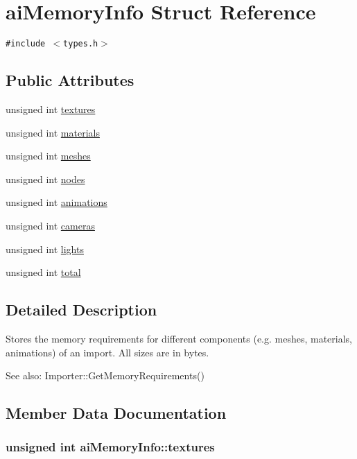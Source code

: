 \hypertarget{structai_memory_info}{
\section{aiMemoryInfo Struct Reference}
\label{structai_memory_info}
}
{\tt \#include $<$types.h$>$}

\subsection*{Public Attributes}
\begin{CompactItemize}
\item 
unsigned int \hyperlink{structai_memory_info_32817d13f0e280777e49769f8c46f168}{textures}
\item 
unsigned int \hyperlink{structai_memory_info_08b2ccd0cef8dec36e47fc1beeb168f1}{materials}
\item 
unsigned int \hyperlink{structai_memory_info_c24ed2b3c141f043765b6e34783d1e24}{meshes}
\item 
unsigned int \hyperlink{structai_memory_info_5a084942c81a29f7bb03c9903430b033}{nodes}
\item 
unsigned int \hyperlink{structai_memory_info_f82394dc3a17a644061ed647817efa68}{animations}
\item 
unsigned int \hyperlink{structai_memory_info_3ddd36d7eabcf989ab72cda2dd3ff015}{cameras}
\item 
unsigned int \hyperlink{structai_memory_info_fcd2ccdfab49e2fce989413a362b8d35}{lights}
\item 
unsigned int \hyperlink{structai_memory_info_590739a4cef4876901d1cf6ff48f01b3}{total}
\end{CompactItemize}


\subsection{Detailed Description}
Stores the memory requirements for different components (e.g. meshes, materials, animations) of an import. All sizes are in bytes. \begin{Desc}
\item[See also:]Importer::GetMemoryRequirements() \end{Desc}


\subsection{Member Data Documentation}
\hypertarget{structai_memory_info_32817d13f0e280777e49769f8c46f168}{
\subsubsection[textures]{\setlength{\rightskip}{0pt plus 5cm}unsigned int {\bf aiMemoryInfo::textures}}}
\label{structai_memory_info_32817d13f0e280777e49769f8c46f168}


